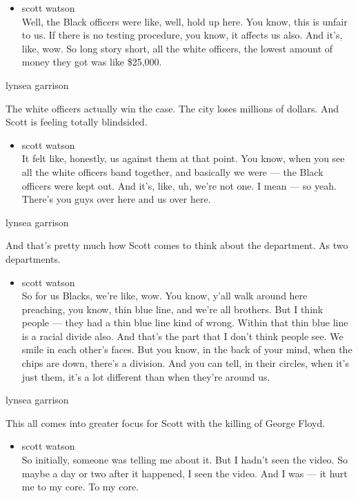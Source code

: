 \begin{itemize}
\tightlist
\item
  scott watson\\
  Well, the Black officers were like, well, hold up here. You know, this
  is unfair to us. If there is no testing procedure, you know, it
  affects us also. And it's, like, wow. So long story short, all the
  white officers, the lowest amount of money they got was like \$25,000.
\end{itemize}

lynsea garrison

The white officers actually win the case. The city loses millions of
dollars. And Scott is feeling totally blindsided.

\begin{itemize}
\tightlist
\item
  scott watson\\
  It felt like, honestly, us against them at that point. You know, when
  you see all the white officers band together, and basically we were
  --- the Black officers were kept out. And it's, like, uh, we're not
  one. I mean --- so yeah. There's you guys over here and us over here.
\end{itemize}

lynsea garrison

And that's pretty much how Scott comes to think about the department. As
two departments.

\begin{itemize}
\tightlist
\item
  scott watson\\
  So for us Blacks, we're like, wow. You know, y'all walk around here
  preaching, you know, thin blue line, and we're all brothers. But I
  think people --- they had a thin blue line kind of wrong. Within that
  thin blue line is a racial divide also. And that's the part that I
  don't think people see. We smile in each other's faces. But you know,
  in the back of your mind, when the chips are down, there's a division.
  And you can tell, in their circles, when it's just them, it's a lot
  different than when they're around us.
\end{itemize}

lynsea garrison

This all comes into greater focus for Scott with the killing of George
Floyd.

\begin{itemize}
\tightlist
\item
  scott watson\\
  So initially, someone was telling me about it. But I hadn't seen the
  video. So maybe a day or two after it happened, I seen the video. And
  I was --- it hurt me to my core. To my core.
\end{itemize}

